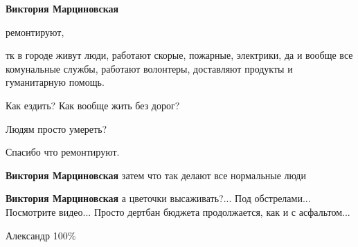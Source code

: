 \begin{multicols}{2}
\begin{itemize}
\textbf{Виктория Марциновская} 

ремонтируют,

тк в городе живут люди, работают скорые, пожарные, электрики, да и вообще все
комунальные службы, работают волонтеры, доставляют продукты и гуманитарную
помощь.

Как ездить? Как вообще жить без дорог?

Людям просто умереть?

Спасибо что ремонтируют.

\textbf{Виктория Марциновская} затем что так делают все нормальные люди

\textbf{Виктория Марциновская} а цветочки высаживать?... Под обстрелами... Посмотрите видео... Просто дертбан бюджета продолжается, как и с асфальтом...

Александр 100\%

\end{itemize} %

\end{multicols} %
